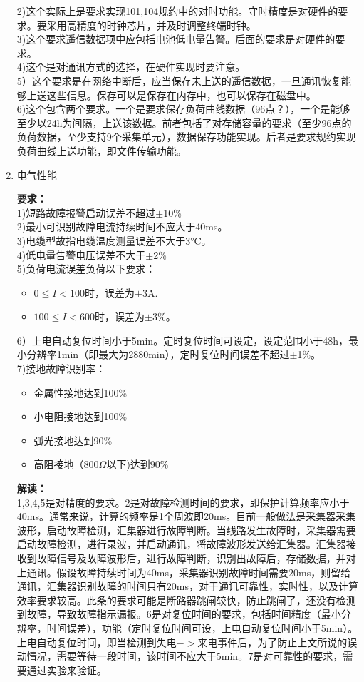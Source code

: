 \documentclass{article}
\begin{document}
\begin{CJK}{UTF8}{gbsn}
\begin{enumerate}
	2)这个实际上是要求实现101,104规约中的对时功能。守时精度是对硬件的要求。要采用高精度的时钟芯片，并及时调整终端时钟。\\
	3)这个要求遥信数据项中应包括电池低电量告警。后面的要求是对硬件的要求。\\
	4)这个是对通讯方式的选择，在硬件实现时要注意。\\
	5）这个要求是在网络中断后，应当保存未上送的遥信数据，一旦通讯恢复能够上送这些信息。保存可以是保存在内存中，也可以保存在磁盘中。\\
	6)这个包含两个要求。一个是要求保存负荷曲线数据（96点？），一个是能够至少以24h为间隔，上送该数据。前者包括了对存储容量的要求（至少96点的负荷数据，至少支持9个采集单元），数据保存功能实现。后者是要求规约实现负荷曲线上送功能，即文件传输功能。
\item 电气性能
	\par
	\textbf{要求：}\\
	1)短路故障报警启动误差不超过$\pm$10\%\\
	2)最小可识别故障电流持续时间不应大于40ms。\\
	3)电缆型故指电缆温度测量误差不大于3°C。\\
	4)低电量告警电压误差不大于$\pm$2\%\\
	5)负荷电流误差负荷以下要求：
	\begin{itemize}
			\item $0\leq I < 100$时，误差为$\pm$3A.
			\item$100\leq I < 600$时，误差为$\pm$3\%。
	\end{itemize}
	6）上电自动复位时间小于5min。定时复位时间可设定，设定范围小于48h，最小分辨率1min（即最大为2880min），定时复位时间误差不超过$\pm$1\%。\\
	7)接地故障识别率：
	\begin{itemize}
			\item 金属性接地达到100\%
			\item 小电阻接地达到100\%
			\item 弧光接地达到90\%
			\item 高阻接地（800$\Omega$以下)达到90\%
	\end{itemize}
	\textbf{解读：}\\
	1,3,4,5是对精度的要求。2是对故障检测时间的要求，即保护计算频率应小于40ms。通常来说，计算的频率是1个周波即20ms。目前一般做法是采集器采集波形，启动故障检测，汇集器进行故障判断。当线路发生故障时，采集器需要启动故障检测，进行录波，并启动通讯，将故障波形发送给汇集器。汇集器接收到故障信号及故障波形后，进行故障判断，识别出故障后，存储数据，并对上通讯。假设故障持续时间为40ms，采集器识别故障时间需要20ms，则留给通讯，汇集器识别故障的时间只有20ms，对于通讯可靠性，实时性，以及计算效率要求较高。此条的要求可能是断路器跳闸较快，防止跳闸了，还没有检测到故障，导致故障指示漏报。6是对复位时间的要求，包括时间精度（最小分辨率，时间误差），功能（定时复位时间可设，上电自动复位时间小于5min）。\\上电自动复位时间，即当检测到失电$->$来电事件后，为了防止上文所说的误动情况，需要等待一段时间，该时间不应大于5min。7是对可靠性的要求，需要通过实验来验证。\\

\end{enumerate}
\end{CJK}
\end{document}
